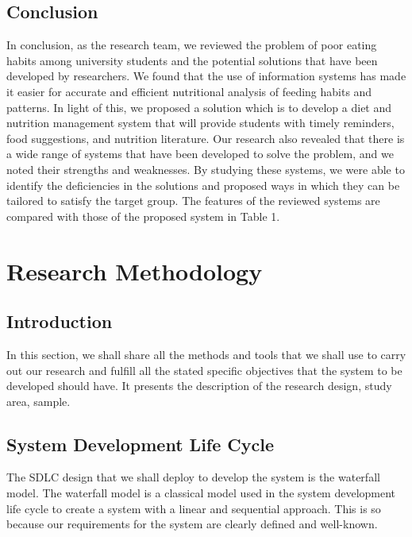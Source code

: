 \documentclass {article}
\begin{document}
\subsection{Conclusion}
\noindent In conclusion, as the research team, we reviewed the problem of poor eating habits among university students and the potential solutions that have been developed by researchers. We found that the use of information systems has made it easier for accurate and efficient nutritional analysis of feeding habits and patterns. In light of this, we proposed a solution which is to develop a diet and nutrition management system that will provide students with timely reminders, food suggestions, and nutrition literature. Our research also revealed that there is a wide range of systems that have been developed to solve the problem, and we noted their strengths and weaknesses. By studying these systems, we were able to identify the deficiencies in the solutions and proposed ways in which they can be tailored to satisfy the target group. The features of the reviewed systems are compared with those of the proposed system in Table 1.\\

\newpage
\section{Research Methodology}
\subsection{Introduction }
\noindent In this section, we shall share all the methods and tools that we shall use to carry out our research and fulfill all the stated specific objectives that the system to be developed should have.  It presents the description of the research design, study area, sample. 

\subsection{System Development Life Cycle}
\noindent The SDLC design that we shall deploy to develop the system is the waterfall model. The waterfall model is a classical model used in the system development life cycle to create a system with a linear and sequential approach. This is so because our requirements for the system are clearly defined and well-known.
\end{document}
